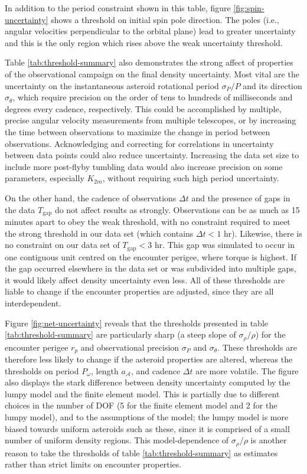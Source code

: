 \documentclass[fleqn,usenatbib]{mnras}
\begin{document}
In addition to the period constraint shown in this table, figure \ref{fig:spin-uncertainty} shows a threshold on initial spin pole direction. The poles (i.e., angular velocities perpendicular to the orbital plane) lead to greater uncertainty and this is the only region which rises above the weak uncertainty threshold.

Table \ref{tab:threshold-summary} also demonstrates the strong affect of properties of the observational campaign on the final density uncertainty. Most vital are the uncertainty on the instantaneous asteroid rotational period $\sigma_P / P$ and its direction $\sigma_\theta$, which require precision on the order of tens to hundreds of milliseconds and degrees every cadence, respectively. This could be accomplished by multiple, precise angular velocity measurements from multiple telescopes, or by increasing the time between observations to maximize the change in period between observations. Acknowledging and correcting for correlations in uncertainty between data points could also reduce uncertainty. Increasing the data set size to include more post-flyby tumbling data would also increase precision on some parameters, especially $K_{2m}$, without requiring such high period uncertainty.

On the other hand, the cadence of observations $\Delta t$ and the presence of gaps in the data $T_\text{gap}$ do not affect results as strongly. Observations can be as much as 15 minutes apart to obey the weak threshold, with no constraint required to meet the strong threshold in our data set (which contains $\Delta t < 1$ hr). Likewise, there is no constraint on our data set of $T_\text{gap} < 3$ hr. This gap was simulated to occur in one contiguous unit centred on the encounter perigee, where torque is highest. If the gap occurred elsewhere in the data set or was subdivided into multiple gaps, it would likely affect density uncertainty even less. All of these thresholds are liable to change if the encounter properties are adjusted, since they are all interdependent.

Figure \ref{fig:net-uncertainty} reveals that the thresholds presented in table \ref{tab:threshold-summary} are particularly sharp (a steep slope of $\sigma_\rho / \rho$) for the encounter perigee $r_p$ and observational precision $\sigma_P$ and $\sigma_\theta$. These thresholds are therefore less likely to change if the asteroid properties are altered, whereas the thresholds on period $P_\omega$, length $a_\mathcal{A}$, and cadence $\Delta t$ are more volatile. The figure also displays the stark difference between density uncertainty computed by the lumpy model and the finite element model. This is partially due to different choices in the number of DOF (5 for the finite element model and 2 for the lumpy model), and to the assumptions of the model; the lumpy model is more biased towards uniform asteroids such as these, since it is comprised of a small number of uniform density regions. This model-dependence of $\sigma_\rho / \rho$ is another reason to take the thresholds of table \ref{tab:threshold-summary} as estimates rather than strict limits on encounter properties.
\end{document}
